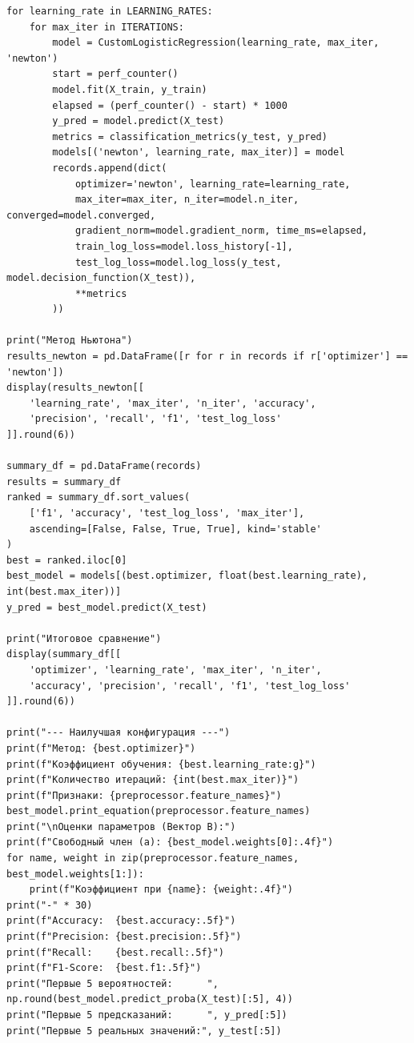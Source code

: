 \documentclass[a4paper,12pt]{article}
\begin{document}
\begin{verbatim}
for learning_rate in LEARNING_RATES:
    for max_iter in ITERATIONS:
        model = CustomLogisticRegression(learning_rate, max_iter, 'newton')
        start = perf_counter()
        model.fit(X_train, y_train)
        elapsed = (perf_counter() - start) * 1000
        y_pred = model.predict(X_test)
        metrics = classification_metrics(y_test, y_pred)
        models[('newton', learning_rate, max_iter)] = model
        records.append(dict(
            optimizer='newton', learning_rate=learning_rate,
            max_iter=max_iter, n_iter=model.n_iter, converged=model.converged,
            gradient_norm=model.gradient_norm, time_ms=elapsed,
            train_log_loss=model.loss_history[-1],
            test_log_loss=model.log_loss(y_test, model.decision_function(X_test)),
            **metrics
        ))

print("Метод Ньютона")
results_newton = pd.DataFrame([r for r in records if r['optimizer'] == 'newton'])
display(results_newton[[
    'learning_rate', 'max_iter', 'n_iter', 'accuracy',
    'precision', 'recall', 'f1', 'test_log_loss'
]].round(6))

summary_df = pd.DataFrame(records)
results = summary_df
ranked = summary_df.sort_values(
    ['f1', 'accuracy', 'test_log_loss', 'max_iter'],
    ascending=[False, False, True, True], kind='stable'
)
best = ranked.iloc[0]
best_model = models[(best.optimizer, float(best.learning_rate), int(best.max_iter))]
y_pred = best_model.predict(X_test)

print("Итоговое сравнение")
display(summary_df[[
    'optimizer', 'learning_rate', 'max_iter', 'n_iter',
    'accuracy', 'precision', 'recall', 'f1', 'test_log_loss'
]].round(6))

print("--- Наилучшая конфигурация ---")
print(f"Метод: {best.optimizer}")
print(f"Коэффициент обучения: {best.learning_rate:g}")
print(f"Количество итераций: {int(best.max_iter)}")
print(f"Признаки: {preprocessor.feature_names}")
best_model.print_equation(preprocessor.feature_names)
print("\nОценки параметров (Вектор B):")
print(f"Свободный член (a): {best_model.weights[0]:.4f}")
for name, weight in zip(preprocessor.feature_names, best_model.weights[1:]):
    print(f"Коэффициент при {name}: {weight:.4f}")
print("-" * 30)
print(f"Accuracy:  {best.accuracy:.5f}")
print(f"Precision: {best.precision:.5f}")
print(f"Recall:    {best.recall:.5f}")
print(f"F1-Score:  {best.f1:.5f}")
print("Первые 5 вероятностей:      ", np.round(best_model.predict_proba(X_test)[:5], 4))
print("Первые 5 предсказаний:      ", y_pred[:5])
print("Первые 5 реальных значений:", y_test[:5])


\end{verbatim}
\end{document}
